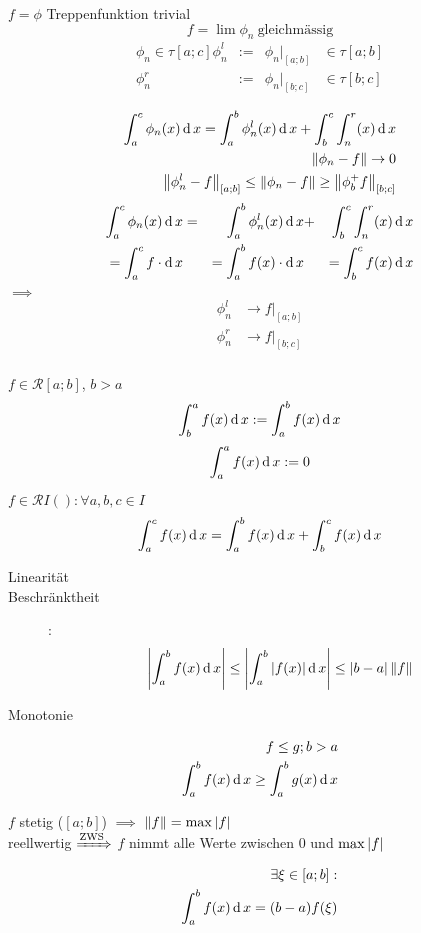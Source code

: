 \begin{Bew}
  $f=\phi$ Treppenfunktion trivial
  \[f=\lim\phi_n\ \text{gleichmässig}\]
  \begin{align*}
    \phi_n\in \tau[a;c]
    \phi_n^l &:=& \phi_n|_{[a;b]}&\in\tau[a;b]\\
    \phi_n^r &:=& \phi_n|_{[b;c]}&\in\tau[b;c]\\
  \end{align*}
  \begin{align*}
    \int^c_a\phi_n(x)\operatorname{d} x = \int^b_a\phi_n^l(x)\operatorname{d} x+\int^c_b \int^r_n(x)\operatorname{d} x\\
    \left\| \phi_n-f \right\|\to0\\
    \left\| \phi_n^l-f \right\|_{[a;b]}\leq \left\| \phi_n-f \right\|\geq \left\| \phi_b^+f \right\|_{[b;c]}
  \end{align*}
  \begin{align*}
    \int^c_a\phi_n(x)\operatorname{d} x &=& \int^b_a\phi_n^l(x)\operatorname{d} x&+&\int^c_b \int^r_n(x)\operatorname{d} x\\
    =\int^c_a f \cdot \operatorname{d} x & &=\int^b_a f(x) \cdot \operatorname{d} x & & =\int^c_b f(x) \operatorname{d} x
  \end{align*}
  $\implies$
  \begin{align*}
    \phi_n^l&\to f|_{[a;b]}\\
    \phi_n^r&\to f|_{[b;c]}\\
  \end{align*}
\end{Bew}
\begin{Def}
  $f\in \mathcal{R}[a;b]$, $b>a$
  \[\int^a_bf(x)\operatorname{d} x := \int^b_af(x)\operatorname{d} x\]
  \[\int^a_af(x)\operatorname{d} x := 0 \]
\end{Def}
\begin{Sat}
  $f\in \mathcal{R}I(): \forall a,b,c \in I$
  \[\int^c_af(x)\operatorname{d} x = \int^b_af(x)\operatorname{d} x + \int^c_bf(x)\operatorname{d} x\]
\end{Sat}
\begin{Bem}
  \begin{description}
    \item[Linearität]
    \item[Beschränktheit]: \[\left| \int^b_af(x)\operatorname{d} x \right|\leq \left| \int^b_a\left| f(x) \right|\operatorname{d} x \right|\leq \left| b-a \right|\left\| f \right\|\]
    \item[Monotonie]
  \end{description}
  \begin{align*}
    f\leq g; b>a\\
    \int^b_a f(x)\operatorname{d} x \geq \int^b_ag(x)\operatorname{d} x
  \end{align*}
\end{Bem}
\begin{Bem}
  $f$ stetig ($[a;b]$) $\implies$ $\left\| f \right\| = \max\left| f \right|$\\
  reellwertig $\xRightarrow{\text{ZWS}}$ $f$ nimmt alle Werte zwischen $0$ und $\max\left| f \right|$ %
  \begin{align*}
    \exists\xi\in [a;b]:\\
    \int^b_af(x)\operatorname{d} x=(b-a)f(\xi)
  \end{align*}
\end{Bem}
